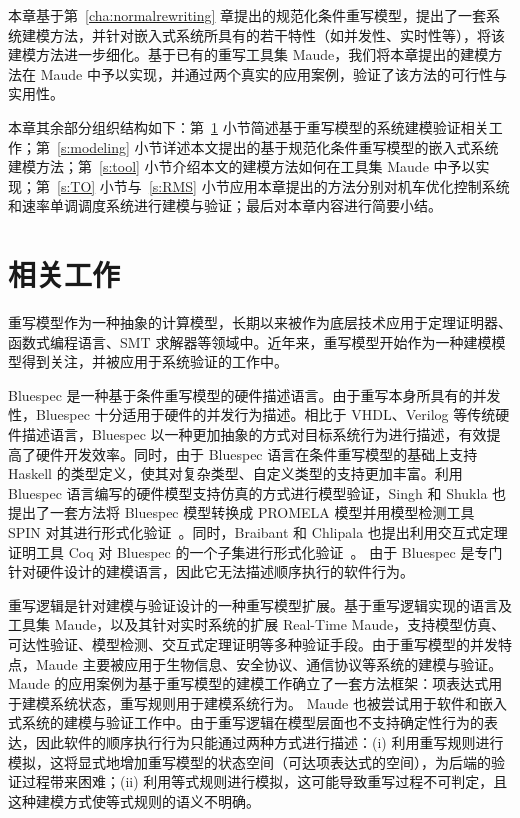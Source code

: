 本章基于第~\ref{cha:normalrewriting} 章提出的规范化条件重写模型，提出了一套系统建模方法，并针对嵌入式系统所具有的若干特性（如并发性、实时性等），将该建模方法进一步细化。基于已有的重写工具集 Maude，我们将本章提出的建模方法在 Maude 中予以实现，并通过两个真实的应用案例，验证了该方法的可行性与实用性。

本章其余部分组织结构如下：第~\ref{s:modeling-related} 小节简述基于重写模型的系统建模验证相关工作；第~\ref{s:modeling} 小节详述本文提出的基于规范化条件重写模型的嵌入式系统建模方法；第~\ref{s:tool} 小节介绍本文的建模方法如何在工具集 Maude 中予以实现；第~\ref{s:TO} 小节与~\ref{s:RMS} 小节应用本章提出的方法分别对机车优化控制系统和速率单调调度系统进行建模与验证；最后对本章内容进行简要小结。 


\section{相关工作}
\label{s:modeling-related}

重写模型作为一种抽象的计算模型，长期以来被作为底层技术应用于定理证明器、函数式编程语言、SMT 求解器等领域中。近年来，重写模型开始作为一种建模模型得到关注，并被应用于系统验证的工作中。

Bluespec 是一种基于条件重写模型的硬件描述语言。由于重写本身所具有的并发性，Bluespec 十分适用于硬件的并发行为描述。相比于 VHDL、Verilog 等传统硬件描述语言，Bluespec 以一种更加抽象的方式对目标系统行为进行描述，有效提高了硬件开发效率。同时，由于 Bluespec 语言在条件重写模型的基础上支持 Haskell 的类型定义，使其对复杂类型、自定义类型的支持更加丰富。利用 Bluespec 语言编写的硬件模型支持仿真的方式进行模型验证，Singh 和 Shukla 也提出了一套方法将 Bluespec 模型转换成 PROMELA 模型并用模型检测工具 SPIN 对其进行形式化验证~\cite{DBLP:conf/mtv/SinghS07}。同时，Braibant 和 Chlipala 也提出利用交互式定理证明工具 Coq 对 Bluespec 的一个子集进行形式化验证~\cite{DBLP:conf/cav/BraibantC13}。 由于 Bluespec 是专门针对硬件设计的建模语言，因此它无法描述顺序执行的软件行为。 

重写逻辑是针对建模与验证设计的一种重写模型扩展。基于重写逻辑实现的语言及工具集 Maude，以及其针对实时系统的扩展 Real-Time Maude，支持模型仿真、可达性验证、模型检测、交互式定理证明等多种验证手段。由于重写模型的并发特点，Maude 主要被应用于生物信息、安全协议、通信协议等系统的建模与验证。Maude 的应用案例为基于重写模型的建模工作确立了一套方法框架：项表达式用于建模系统状态，重写规则用于建模系统行为。 Maude 也被尝试用于软件和嵌入式系统的建模与验证工作中。由于重写逻辑在模型层面也不支持确定性行为的表达，因此软件的顺序执行行为只能通过两种方式进行描述：(i) 利用重写规则进行模拟，这将显式地增加重写模型的状态空间（可达项表达式的空间），为后端的验证过程带来困难；(ii) 利用等式规则进行模拟，这可能导致重写过程不可判定，且这种建模方式使等式规则的语义不明确。

